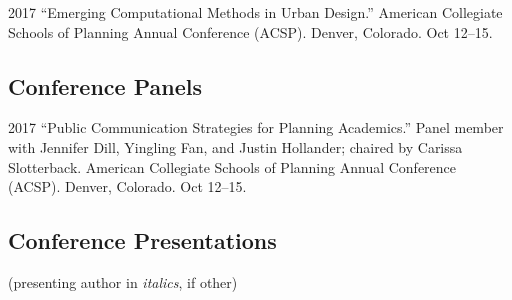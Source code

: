 \documentclass{academiccv}
\begin{document}
\begin{tablist}
	
\item[2017] \tab \enquote{Emerging Computational Methods in Urban Design.} American Collegiate Schools of Planning Annual Conference (ACSP). Denver, Colorado. Oct 12--15.
	
\end{tablist}

\subsection*{Conference Panels}

\begin{tablist}

\item[2017] \tab \enquote{Public Communication Strategies for Planning Academics.} Panel member with Jennifer Dill, Yingling Fan, and Justin Hollander; chaired by Carissa Slotterback. American Collegiate Schools of Planning Annual Conference (ACSP). Denver, Colorado. Oct 12--15.

\end{tablist}

\subsection*{Conference Presentations}

(presenting author in \textit{italics}, if other)\bigskip
\end{document}
